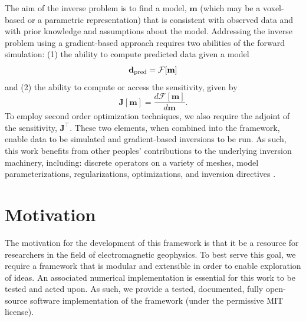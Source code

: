 The aim of the inverse problem is to find a model, $\mathbf{m}$ (which may be a voxel-based or a parametric representation) that is consistent with observed data and with prior knowledge and assumptions about the model. Addressing the inverse problem using a gradient-based approach requires two abilities of the forward simulation: (1) the ability to compute predicted data given a model
\begin{equation}
\mathbf{d}_\text{pred} = \mathcal{F}[\mathbf{m}]
\label{eq:dpred}
\end{equation}
and (2) the ability to compute or access the sensitivity, given by
\begin{equation}
    \mathbf{J}[\mathbf{m}] = \frac{d \mathcal{F}[\mathbf{m}]}{ d \mathbf{m}}.
    \label{eq:sensitivity}
\end{equation}
To employ second order optimization techniques, we also require  the adjoint of the sensitivity, $\mathbf{J}^\top$. These two elements, when combined into the \SimPEG framework, enable data to be simulated and gradient-based inversions to be run. As such, this work benefits from other peoples' contributions to the underlying inversion machinery, including: discrete operators on a variety of meshes, model parameterizations, regularizations, optimizations, and inversion directives \citep{Cockett2015}.


\section{Motivation}
\label{sec:Motivation}

The motivation for the development of this framework is that it be a resource
for researchers in the field of electromagnetic geophysics. To best serve this
goal, we require a framework that is modular and extensible in order to enable
exploration of ideas. An associated numerical implementation is essential for
this work to be tested and acted upon. As such, we provide a tested,
documented, fully open-source software implementation of the framework (under the permissive MIT license).

